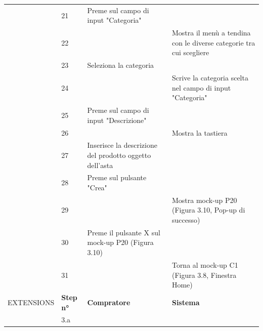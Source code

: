 \begin{longtable}{|C{3.0cm}|C{1.3cm}|L{5.2cm}|L{5.2cm}|}
                        & 21
                        & Preme sul campo di input "Categoria"
                        & \\
                        & 22
                        &
                        & Mostra il menù a tendina con le diverse categorie tra cui scegliere \\
                        & 23
                        & Seleziona la categoria
                        & \\
                        & 24
                        & 
                        & Scrive la categoria scelta nel campo di input "Categoria"\\
                        & 25
                        & Preme sul campo di input "Descrizione"
                        & \\
                        & 26
                        &
                        & Mostra la tastiera \\
                        & 27
                        & Inserisce la descrizione del prodotto oggetto dell'asta
                        & \\
                        & 28
                        & Preme sul pulsante "Crea"
                        & \\
                        & 29
                        & 
                        & Mostra mock-up P20 (Figura 3.10, Pop-up di successo)\\
                        & 30
                        & Preme il pulsante X sul mock-up P20 (Figura 3.10)
                        & \\
                        & 31
                        & 
                        & Torna al mock-up C1 (Figura 3.8, Finestra Home)\\
                \hline
                    EXTENSIONS
                    & \textbf{Step n°} 
                    & \textbf{Compratore} 
                    & \textbf{Sistema}\\
                \hline
                        & 3.a

\end{longtable}
